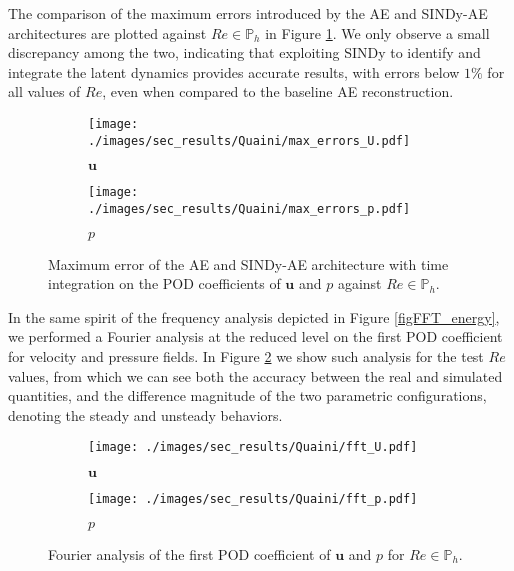 \documentclass[reqno]{amsart}[standalone]
\theoremstyle{definition}
\theoremstyle{remark}
\newcommand{\bs}{\boldsymbol}
\begin{document}
The comparison of the maximum errors introduced by the AE and SINDy-AE architectures are plotted against $Re\in\mathbb{P}_h$ in Figure \ref{figQUAINI_P_ERR}. We only observe a small discrepancy among the two, indicating that exploiting SINDy to identify and integrate the latent dynamics provides accurate results, with errors below $1\%$ for all values of $Re$, even when compared to the baseline AE reconstruction.


\begin{figure}[htbp]
\begin{subfigure}{0.47\linewidth}
\centering
\texttt{[image: ./images/sec\_results/Quaini/max\_errors\_U.pdf]}
\caption{$\bs{u}$}
\end{subfigure}
\hspace{0.6cm}
\begin{subfigure}{0.47\linewidth}
\centering
\texttt{[image: ./images/sec\_results/Quaini/max\_errors\_p.pdf]}
\caption{$p$}
\end{subfigure}
\caption{Maximum error of the AE and SINDy-AE architecture with time integration on the POD coefficients of $\bs{u}$ and $p$ against $Re\in \mathbb{P}_h$.}
\label{figQUAINI_P_ERR}
\end{figure}


In the same spirit of the frequency analysis depicted in Figure \ref{figFFT_energy}, we performed a Fourier analysis at the reduced level on the first POD coefficient for velocity and pressure fields. In Figure \ref{fft_PARAM} we show such analysis for the test $Re$ values, from which we can see both the accuracy between the real and simulated quantities, and the difference magnitude of the two parametric configurations, denoting the steady and unsteady behaviors.


\begin{figure}[htbp]
\begin{subfigure}{0.47\linewidth}
\centering
\texttt{[image: ./images/sec\_results/Quaini/fft\_U.pdf]}
\caption{$\bs{u}$}
\end{subfigure}
\hspace{0.6cm}
\begin{subfigure}{0.47\linewidth}
\centering
\texttt{[image: ./images/sec\_results/Quaini/fft\_p.pdf]}
\caption{$p$}
\end{subfigure}
\caption{Fourier analysis of the first POD coefficient of $\bs{u}$ and $p$ for $Re\in\mathbb{P}_h$.}
\label{fft_PARAM}
\end{figure}
\end{document}
